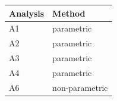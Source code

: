 \begin{table}[ht]
\centering
\begingroup\footnotesize
\begin{tabular}{ll}
  \toprule
Analysis & Method \\ 
  \midrule
A1 & parametric \\ 
  A2 & parametric \\ 
  A3 & parametric \\ 
  A4 & parametric \\ 
  A6 & non-parametric \\ 
   \bottomrule
\end{tabular}
\endgroup
\end{table}
